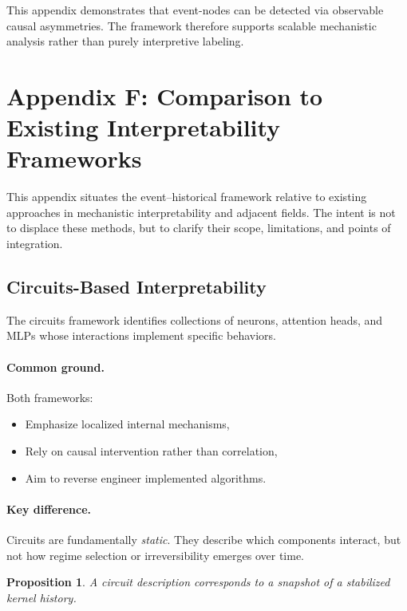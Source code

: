\documentclass[11pt]{article}
\newtheorem{proposition}{Proposition}
\theoremstyle{remark}
\begin{document}
This appendix demonstrates that event-nodes can be detected via
observable causal asymmetries. The framework therefore supports
scalable mechanistic analysis rather than purely interpretive labeling.

\section{Appendix F: Comparison to Existing Interpretability Frameworks}

This appendix situates the event–historical framework relative to
existing approaches in mechanistic interpretability and adjacent
fields. The intent is not to displace these methods, but to clarify
their scope, limitations, and points of integration.

\subsection{Circuits-Based Interpretability}

The circuits framework identifies collections of neurons, attention
heads, and MLPs whose interactions implement specific behaviors.

\paragraph{Common ground.}
Both frameworks:
\begin{itemize}
\item Emphasize localized internal mechanisms,
\item Rely on causal intervention rather than correlation,
\item Aim to reverse engineer implemented algorithms.
\end{itemize}

\paragraph{Key difference.}
Circuits are fundamentally \emph{static}. They describe which
components interact, but not how regime selection or irreversibility
emerges over time.

\begin{proposition}
A circuit description corresponds to a snapshot of a stabilized kernel
history.
\end{proposition}
\end{document}
